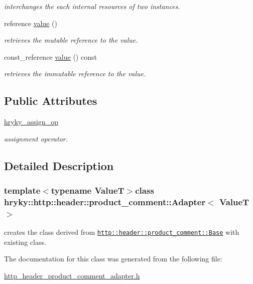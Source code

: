 \begin{DoxyCompactItemize}
\begin{DoxyCompactList}\small\item\em interchanges the each internal resources of two instances. \end{DoxyCompactList}\item 
\hypertarget{classhryky_1_1_adapter_ab736ecd30f215ca3cbd2364f818cb83f}{reference \hyperlink{classhryky_1_1_adapter_ab736ecd30f215ca3cbd2364f818cb83f}{value} ()}\label{classhryky_1_1_adapter_ab736ecd30f215ca3cbd2364f818cb83f}

\begin{DoxyCompactList}\small\item\em retrieves the mutable reference to the value. \end{DoxyCompactList}\item 
\hypertarget{classhryky_1_1_adapter_a5856f2ee6c0622e153f52fbb6ca6bbe9}{const\-\_\-reference \hyperlink{classhryky_1_1_adapter_a5856f2ee6c0622e153f52fbb6ca6bbe9}{value} () const}\label{classhryky_1_1_adapter_a5856f2ee6c0622e153f52fbb6ca6bbe9}

\begin{DoxyCompactList}\small\item\em retrieves the immutable reference to the value. \end{DoxyCompactList}\end{DoxyCompactItemize}
\subsection*{Public Attributes}
\begin{DoxyCompactItemize}
\item 
\hypertarget{classhryky_1_1_adapter_a764c5fe566545047f3acaf18792e5102}{\hyperlink{classhryky_1_1_adapter_a764c5fe566545047f3acaf18792e5102}{hryky\-\_\-assign\-\_\-op}}\label{classhryky_1_1_adapter_a764c5fe566545047f3acaf18792e5102}

\begin{DoxyCompactList}\small\item\em assignment operator. \end{DoxyCompactList}\end{DoxyCompactItemize}


\subsection{Detailed Description}
\subsubsection*{template$<$typename Value\-T$>$class hryky\-::http\-::header\-::product\-\_\-comment\-::\-Adapter$<$ Value\-T $>$}

creates the class derived from \href{http::header::product_comment::Base}{\tt http\-::header\-::product\-\_\-comment\-::\-Base} with existing class. 

The documentation for this class was generated from the following file\-:\begin{DoxyCompactItemize}
\item 
\hyperlink{http__header__product__comment__adapter_8h}{http\-\_\-header\-\_\-product\-\_\-comment\-\_\-adapter.\-h}\end{DoxyCompactItemize}
